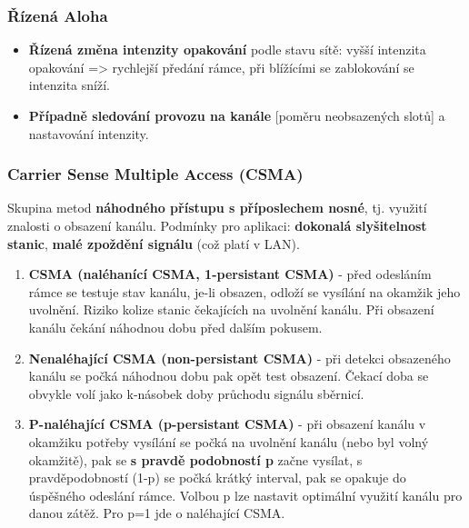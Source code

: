 \subsubsection*{Řízená Aloha}
\begin{itemize}
\item \textbf{Řízená změna intenzity opakování} podle stavu sítě: vyšší intenzita opakování => rychlejší předání rámce, při blížícími se zablokování se intenzita sníží.
\item \textbf{Případně sledování provozu na kanále} [poměru neobsazených slotů] a nastavování intenzity.
\end{itemize}

\subsubsection*{Carrier Sense Multiple Access (CSMA)}
Skupina metod \textbf{náhodného přístupu s příposlechem nosné}, tj. využití znalosti o obsazení kanálu. Podmínky pro aplikaci: \textbf{dokonalá slyšitelnost stanic}, \textbf{malé zpoždění signálu} (což platí v LAN).

\begin{enumerate}
\item \textbf{CSMA (naléhanící CSMA, 1-persistant CSMA)} - před odesláním rámce se testuje stav kanálu, je-li obsazen, odloží se vysílání na okamžik jeho uvolnění. Riziko kolize stanic čekajících na uvolnění kanálu. Při obsazení kanálu čekání náhodnou dobu před dalším pokusem.
\item \textbf{Nenaléhající CSMA (non-persistant CSMA)} - při detekci obsazeného kanálu se počká náhodnou dobu pak opět test obsazení. Čekací doba se obvykle volí jako k-násobek doby průchodu signálu sběrnicí.
\item \textbf{P-naléhající CSMA (p-persistant CSMA)} - při obsazení kanálu v okamžiku potřeby vysílání se počká na uvolnění kanálu (nebo byl volný okamžitě), pak se \textbf{s pravdě podobností p} začne vysílat, s pravděpodobností (1-p) se počká krátký interval, pak se opakuje do úspěšného odeslání rámce. Volbou p lze nastavit optimální využití kanálu pro danou zátěž. Pro p=1 jde o naléhající CSMA.
\end{enumerate}

